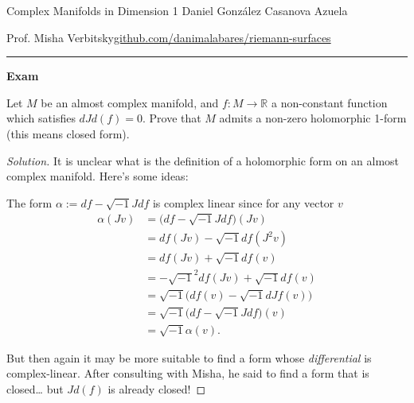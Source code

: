 

\usepackage[style=authortitle-terse,backend=bibtex]{biblatex}




\begin{minipage}{\textwidth}
		Complex Manifolds in Dimension 1 \hfill Daniel González Casanova Azuela
		
		{Prof. Misha Verbitsky\hfill\href{https://github.com/danimalabares/riemann-surfaces}{github.com/danimalabares/riemann-surfaces}}
\end{minipage}\vspace{.2cm}\hrule

\vspace{10pt}
{\huge\bfseries Exam}

\tableofcontents

\begin{manualexercise}{1.3}
	Let $M$ be an almost complex manifold, and $f:M\to \mathbb{R}$ a non-constant function which satisfies $d Jd(f)=0$. Prove that $M$ admits a non-zero holomorphic 1-form (this means closed form).
\end{manualexercise}

\begin{proof}[Solution]
	It is unclear what is the definition of a holomorphic form on an almost complex manifold. Here's some ideas:

	The form $\alpha:=df-\sqrt{-1}Jdf$ is complex linear since for any vector $v$
	\begin{align*}
		\alpha(Jv)&=\Big(df-\sqrt{-1}Jdf\Big)(Jv)\\
		&=df(Jv)-\sqrt{-1}df(J^2v)\\
		&=df(Jv)+\sqrt{-1}df(v)\\
		&=-\sqrt{-1}^2df(Jv)+\sqrt{-1}df(v)\\
		&=\sqrt{-1}\Big(df(v)-\sqrt{-1}d Jf(v)\Big)\\
		&=\sqrt{-1}\Big(df-\sqrt{-1}Jdf\Big)(v)\\
		&=\sqrt{-1}\alpha(v).
	\end{align*}

But then again it may be more suitable to find a form whose \textit{differential} is complex-linear. After consulting with Misha, he said to find a form that is closed… but $Jd(f)$ is already closed!
\end{proof}

